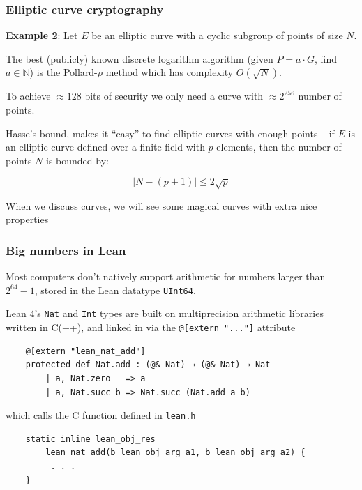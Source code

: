 \documentclass[options]{beamer}
\begin{document}
\begin{frame}
    \frametitle{Elliptic curve cryptography}

    
    {\bf Example 2}: Let $E$ be an elliptic curve with a cyclic subgroup of points of size $N$.
    
    The best (publicly) known discrete logarithm algorithm (given $P = a \cdot G$, find $a \in \mathbb{N}$) is the Pollard-$\rho$ method which has complexity $O(\sqrt{N})$.

    To achieve $\approx 128$ bits of security we only need a curve with $\approx 2^{256}$ number of points.

    \vspace{6pt}
    \pause
    
    Hasse's bound, makes it ``easy'' to find elliptic curves with enough points -- if $E$ is an elliptic curve defined over a finite field with $p$ elements, then the number of points $N$ is bounded by:

    $$\left| N - (p + 1)\right| \leq 2 \sqrt{p}$$

    When we discuss curves, we will see some magical curves with extra nice properties

\end{frame}
\begin{frame}[fragile]
    \frametitle{Big numbers in Lean}

    Most computers don't natively support arithmetic for numbers larger than $2^{64} - 1$, stored in the Lean datatype \verb+UInt64+.

    Lean 4's \verb+Nat+ and \verb+Int+ types are built on multiprecision arithmetic libraries written in C(++), and linked in via the \verb+@[extern "..."]+ attribute
    \begin{verbatim}
    @[extern "lean_nat_add"]
    protected def Nat.add : (@& Nat) → (@& Nat) → Nat
        | a, Nat.zero   => a
        | a, Nat.succ b => Nat.succ (Nat.add a b)
    \end{verbatim}

    \vspace{6pt}
    \pause
    
    which calls the C function defined in \verb+lean.h+

    \begin{verbatim}
    static inline lean_obj_res 
        lean_nat_add(b_lean_obj_arg a1, b_lean_obj_arg a2) {
         . . .
    }
    \end{verbatim}
\end{frame}
\end{document}
